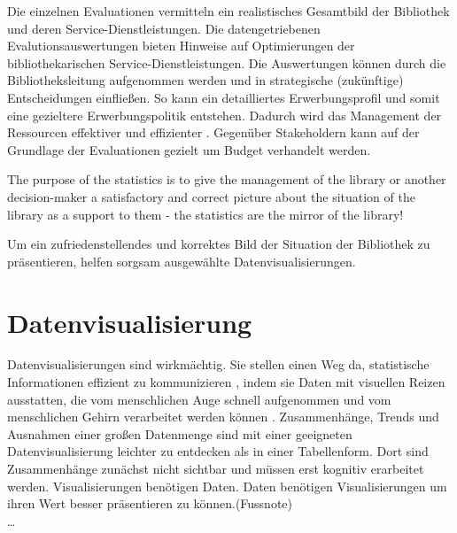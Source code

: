 Die einzelnen Evaluationen vermitteln ein realistisches Gesamtbild der Bibliothek und deren Service-Dienstleistungen. 
Die datengetriebenen Evalutionsauswertungen bieten Hinweise auf Optimierungen der bibliothekarischen Service-Dienstleistungen. 
Die Auswertungen können durch die Bibliotheksleitung aufgenommen werden und in strategische (zukünftige) Entscheidungen einfließen. 
So kann ein detailliertes Erwerbungsprofil und somit eine gezieltere Erwerbungspolitik entstehen. 
Dadurch wird das Management der Ressourcen effektiver und effizienter \cite[Vgl.][297]{johnson_peggy_fundamentals_2014}.
Gegenüber Stakeholdern kann auf der Grundlage der Evaluationen gezielt um Budget verhandelt werden.
\begin{displayquote}
    The purpose of the statistics is to give the management of the library or another decision-maker 
    a satisfactory and correct picture about the situation of the library as a support to them - the statistics are the mirror of the library!
    \cite[463]{laitinen_markku_library_2013}
\end{displayquote}

Um ein zufriedenstellendes und korrektes Bild der Situation der Bibliothek zu präsentieren, helfen sorgsam ausgewählte Datenvisualisierungen.



\clearpage
\section{Datenvisualisierung}
\label{chap:two_two}
Datenvisualisierungen sind wirkmächtig. Sie stellen einen Weg da, statistische Informationen effizient zu kommunizieren \cite[Vgl.][15]{Tufte01}, 
indem sie Daten mit visuellen Reizen ausstatten, die vom menschlichen Auge schnell aufgenommen und vom menschlichen Gehirn verarbeitet werden können \cite[Vgl.][32]{few_now_2009}. 
Zusammenhänge, Trends und Ausnahmen einer großen Datenmenge sind mit einer geeigneten Datenvisualisierung leichter zu entdecken als in einer Tabellenform. 
Dort sind Zusammenhänge zunächst nicht sichtbar und müssen erst kognitiv erarbeitet werden. Visualisierungen benötigen Daten.
Daten benötigen Visualisierungen um ihren Wert besser präsentieren zu können.(Fussnote)\\
\dots\\

%

